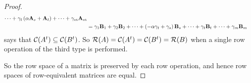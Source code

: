 \documentclass{ximera}
\begin{document}
\begin{theorem}
\begin{proof}
\begin{align*}
                \cdots+
                \gamma_t\left(\alpha\mathbf{A}_s+\mathbf{A}_t\right)+
                \cdots+
                \gamma_m\mathbf{A}_m\\
              &=
                \gamma_1\mathbf{B}_1+
                \gamma_2\mathbf{B}_2+
                \cdots+
                \left(-\alpha\gamma_t+\gamma_s\right)\mathbf{B}_s+
                \cdots+
                \gamma_t\mathbf{B}_t+
                \cdots+
                \gamma_m\mathbf{B}_m
    \end{align*}
    says that $\mathcal{C}\!\left(A^{t}\right)\subseteq\mathcal{C}\!\left(B^{t}\right)$.  So
    $\mathcal{R}\!\left(A\right)=\mathcal{C}\!\left(A^{t}\right)=\mathcal{C}\!\left(B^{t}\right)=\mathcal{R}\!\left(B\right)$ when a
    single row operation of the third type is performed.

    So the row space of a matrix is preserved by each row operation,
    and hence row spaces of row-equivalent matrices are equal.
\end{proof}
\end{theorem}
\end{document}
